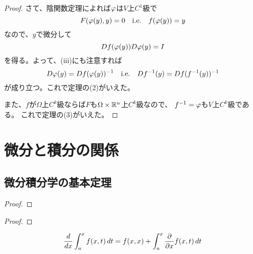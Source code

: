 \documentclass[report]{jlreq}
\begin{document}
\begin{proof}
    さて、陰関数定理によれば$\varphi$は$V$上$C^1$級で
    \begin{equation}
        F(\varphi(y), y) = 0
        \quad \text{i.e.} \quad
        f(\varphi(y)) = y
    \end{equation}
    なので、$y$で微分して
    \begin{equation}
        Df(\varphi(y)) D\varphi(y) = I
    \end{equation}
    を得る。よって、(iii)にも注意すれば
    \begin{equation}
        D\varphi(y) = Df(\varphi(y))^{-1}
        \quad \text{i.e.} \quad
        Df^{-1}(y) = Df(f^{-1}(y))^{-1}
    \end{equation}
    が成り立つ。これで定理の(2)がいえた。

    また、$f$が$\Omega$上$C^k$級ならば$F$も$\Omega \times \mathbb{R}^n$上$C^k$級なので、
    $f^{-1} = \varphi$も$V$上$C^k$級である。
    これで定理の(3)がいえた。
\end{proof}



%
\chapter{微分と積分の関係}

%
\section{微分積分学の基本定理}

\begin{theorem}
    \TODO{}
\end{theorem}

\begin{proof}
    \TODO{}
\end{proof}

\begin{theorem}
    \TODO{}
\end{theorem}

\begin{proof}
    \TODO{}
\end{proof}

\begin{theorem}
    \TODO{}
    \begin{equation}
        \dd{x} \int_a^x f(x, t) \, dt
            = f(x, x) + \int_a^x \deldel{x} f(x, t) \, dt
    \end{equation}
\end{theorem}
\end{document}
